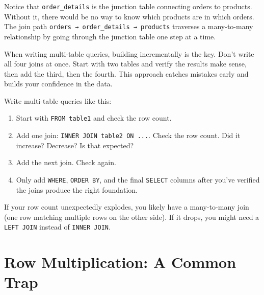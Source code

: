 \documentclass[
  letterpaper,
  DIV=11,
  numbers=noendperiod]{scrreprt}
\providecommand{\tightlist}{%
  \setlength{\itemsep}{0pt}\setlength{\parskip}{0pt}}
\begin{document}
Notice that \texttt{order\_details} is the junction table connecting
orders to products. Without it, there would be no way to know which
products are in which orders. The join path
\texttt{orders\ →\ order\_details\ →\ products} traverses a many-to-many
relationship by going through the junction table one step at a time.

When writing multi-table queries, building incrementally is the key.
Don't write all four joins at once. Start with two tables and verify the
results make sense, then add the third, then the fourth. This approach
catches mistakes early and builds your confidence in the data.

\begin{tcolorbox}[enhanced jigsaw, opacitybacktitle=0.6, arc=.35mm, colback=white, bottomtitle=1mm, opacityback=0, toprule=.15mm, left=2mm, colbacktitle=quarto-callout-tip-color!10!white, breakable, coltitle=black, toptitle=1mm, colframe=quarto-callout-tip-color-frame, bottomrule=.15mm, titlerule=0mm, title=\textcolor{quarto-callout-tip-color}{\faLightbulb}\hspace{0.5em}{Building Queries Incrementally}, rightrule=.15mm, leftrule=.75mm]

Write multi-table queries like this:

\begin{enumerate}
\def\labelenumi{\arabic{enumi}.}
\tightlist
\item
  Start with \texttt{FROM\ table1} and check the row count.
\item
  Add one join: \texttt{INNER\ JOIN\ table2\ ON\ ...}. Check the row
  count. Did it increase? Decrease? Is that expected?
\item
  Add the next join. Check again.
\item
  Only add \texttt{WHERE}, \texttt{ORDER\ BY}, and the final
  \texttt{SELECT} columns after you've verified the joins produce the
  right foundation.
\end{enumerate}

If your row count unexpectedly explodes, you likely have a many-to-many
join (one row matching multiple rows on the other side). If it drops,
you might need a \texttt{LEFT\ JOIN} instead of \texttt{INNER\ JOIN}.

\end{tcolorbox}

\section{Row Multiplication: A Common
Trap}\label{row-multiplication-a-common-trap}
\end{document}
